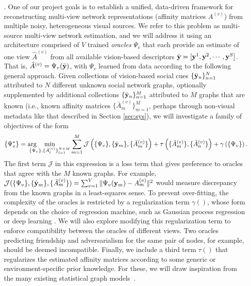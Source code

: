 .  One of our project goals is to establish a unified, data-driven framework for reconstructing multi-view network representations (affinity matrices $A^{(v)}$) from multiple noisy, heterogeneous visual sources. We refer to this problem as multi-source multi-view network estimation, and we will address it using an architecture  comprised of $V$ trained \emph{oracles} $\Psi_{v}$ that each provide an estimate of one view $\hat{A}^{(v)}$ from all available vision-based descriptors $\bar{{\bf y}}=[{\bf y}^1,{\bf y}^2, \cdots,{\bf y}^S]$. That is, $\hat{A}^{(v)}=\Psi_{v}(\bar{{\bf y}})$, with $\Psi_{v}$ learned from data according to the following general approach. Given collections of vision-based social cues $\{\bar{{\bf y}}_{n}\}_{n=1}^{N}$ attributed to $N$ different unknown social network graphs, optionally supplemented by additional collections $\{\bar{{\bf y}}_{n}\}_{n=1}^{M}$ attributed to $M$ graphs that are known (i.e., known 
affinity matrices $\{\bar{A}^{(v)}_{m}\}_{m=1}^{M}$, perhaps through non-visual metadata like that described in Section \ref{sec:sys}), we will investigate a family of objectives of the form
\begin{equation}\label{eq:sensing}
\{\Psi^{*}_{v}\}=\arg\!\!\!\!\!\!\!\!\min_{\{\Psi_{v}\},\{\hat{A}^{(v)}_l\}_{l=1}^{N+M}}\sum_{m=1}^{M}\mathcal{J}\left(\{\Psi_{v}\}, \{\bar{\vy}_m\}, \{\bar{A}^{(v)}_m\}\right)+\tau\left(\{\hat{A}^{(v)}_m\},\{\hat{A}^{(v)}_n\}\right)+\gamma\left(\{\Psi_{v}\}\right).
 \end{equation}
The first term $\mathcal{J}$ in this expression is a loss term that gives preference to oracles that agree with the $M$ known graphs. For example,  $\mathcal{J}(\{\Psi_{v}\}, \{\bar{{\bf y}}_m\}, \{\bar{A}^{(v)}_m\})=\sum_{v=1}^{V}\|\Psi_{v}({\bf y}_m)-A^{(v)}_m\|^{2}$ would measure discrepancy from the known graphs in a least-squares sense. To prevent over-fitting, the complexity of the oracles is restricted by a regularization term $\gamma()$, whose form depends on the choice of regression machine, such as Gaussian process regression \cite{GPbook} or deep learning \cite{DLbook}. We will also explore modifying this regularization term to enforce compatibility between the oracles of different views. Two oracles predicting friendship and adversarialism for the same pair of nodes, for example, should be deemed incompatible. Finally, we include a third term $\tau()$ that regularizes the estimated affinity matrices according to some generic or environment-specific prior knowledge. For these, we will draw inspiration from the many existing statistical graph models~\cite{Goldenberg}.


